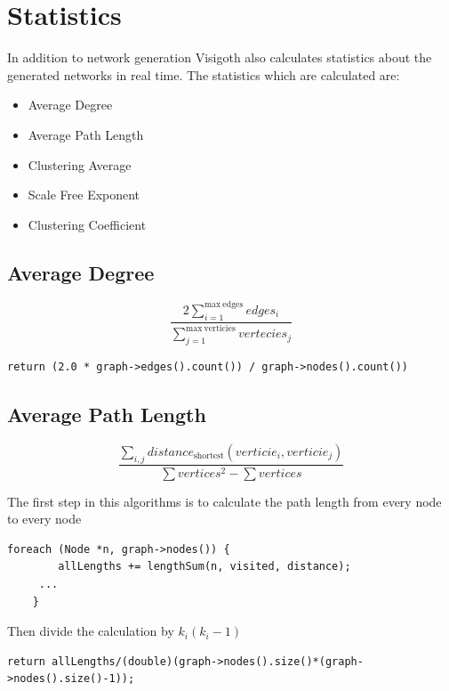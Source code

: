 \documentclass[a4paper,11pt,titlepage]{article}
\let\stdsection\section         %
\renewcommand{\section}{\newpage\stdsection}
\begin{document}
\section{Statistics}


In addition to network generation Visigoth also calculates statistics about the
generated networks in real time. The statistics which are calculated are:


\begin{itemize}
	\item Average Degree
	\item Average Path Length
	\item Clustering Average
	\item Scale Free Exponent
	\item Clustering Coefficient
\end{itemize}

\subsection{Average Degree}
\[
\frac{2\sum_{i=1}^{\mathrm{max\ edges}} edges_i}{\sum_{j=1}^{\mathrm{max\
verticies}} vertecies_j}
\]

\begin{lstlisting}
return (2.0 * graph->edges().count()) / graph->nodes().count())
\end{lstlisting}

\subsection{Average Path Length}
\[
\frac{\sum_{i,j}distance_\mathrm{shortest}(verticie_i,verticie_j)}{\sum
vertices^2 - \sum vertices}
\]

The first step in this algorithms is to calculate the path length from every
node to every node

\begin{lstlisting}
foreach (Node *n, graph->nodes()) {
        allLengths += lengthSum(n, visited, distance);
	 ...
    }
\end{lstlisting}
Then divide the calculation by $k_i(k_i-1)$
\begin{lstlisting}
return allLengths/(double)(graph->nodes().size()*(graph->nodes().size()-1));
\end{lstlisting}
\end{document}
